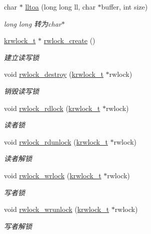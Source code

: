\begin{DoxyCompactItemize}
char $\ast$ \hyperlink{a00099_a97f61794357611fc4017112c868420b9_a97f61794357611fc4017112c868420b9}{lltoa} (long long ll, char $\ast$buffer, int size)
\begin{DoxyCompactList}\small\item\em long long 转为char$\ast$ \end{DoxyCompactList}\item 
\hyperlink{a00066_a95d7b2a7caea750fda47edc638788908_a95d7b2a7caea750fda47edc638788908}{krwlock\+\_\+t} $\ast$ \hyperlink{a00099_af899c6ba097aac0431be0259d4a317ed_af899c6ba097aac0431be0259d4a317ed}{rwlock\+\_\+create} ()
\begin{DoxyCompactList}\small\item\em 建立读写锁 \end{DoxyCompactList}\item 
void \hyperlink{a00099_ad20298954497151f650d24c786e2af17_ad20298954497151f650d24c786e2af17}{rwlock\+\_\+destroy} (\hyperlink{a00066_a95d7b2a7caea750fda47edc638788908_a95d7b2a7caea750fda47edc638788908}{krwlock\+\_\+t} $\ast$rwlock)
\begin{DoxyCompactList}\small\item\em 销毁读写锁 \end{DoxyCompactList}\item 
void \hyperlink{a00099_a80866f5ce1f4238d179237b0af18156f_a80866f5ce1f4238d179237b0af18156f}{rwlock\+\_\+rdlock} (\hyperlink{a00066_a95d7b2a7caea750fda47edc638788908_a95d7b2a7caea750fda47edc638788908}{krwlock\+\_\+t} $\ast$rwlock)
\begin{DoxyCompactList}\small\item\em 读者锁 \end{DoxyCompactList}\item 
void \hyperlink{a00099_a2262145a5509ffa9b17db8f41ee28b8c_a2262145a5509ffa9b17db8f41ee28b8c}{rwlock\+\_\+rdunlock} (\hyperlink{a00066_a95d7b2a7caea750fda47edc638788908_a95d7b2a7caea750fda47edc638788908}{krwlock\+\_\+t} $\ast$rwlock)
\begin{DoxyCompactList}\small\item\em 读者解锁 \end{DoxyCompactList}\item 
void \hyperlink{a00099_a8894bccb783aaa36d111e838596ad15f_a8894bccb783aaa36d111e838596ad15f}{rwlock\+\_\+wrlock} (\hyperlink{a00066_a95d7b2a7caea750fda47edc638788908_a95d7b2a7caea750fda47edc638788908}{krwlock\+\_\+t} $\ast$rwlock)
\begin{DoxyCompactList}\small\item\em 写者锁 \end{DoxyCompactList}\item 
void \hyperlink{a00099_a3d305ecac0cf25e26fb3d0d0780d38dd_a3d305ecac0cf25e26fb3d0d0780d38dd}{rwlock\+\_\+wrunlock} (\hyperlink{a00066_a95d7b2a7caea750fda47edc638788908_a95d7b2a7caea750fda47edc638788908}{krwlock\+\_\+t} $\ast$rwlock)
\begin{DoxyCompactList}\small\item\em 写者解锁 \end{DoxyCompactList}\end{DoxyCompactItemize}


